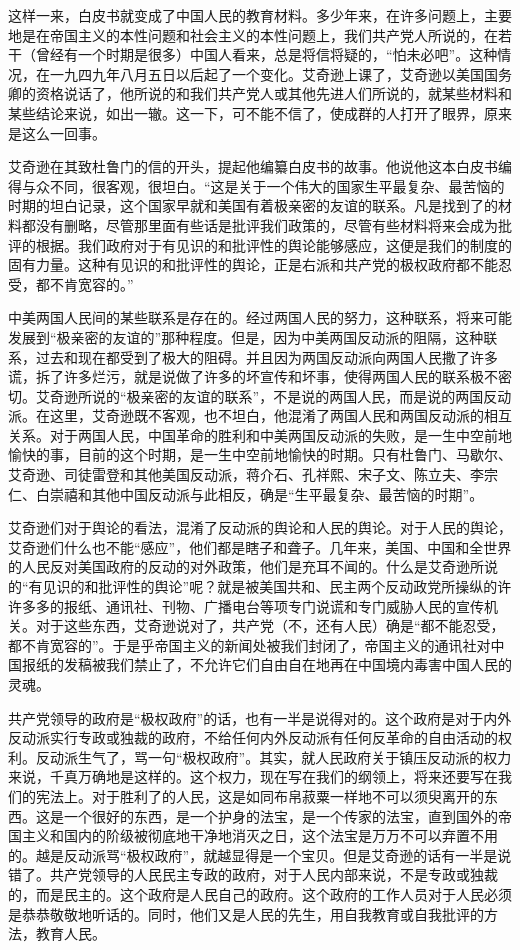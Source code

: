 \documentclass[UTF-8, a5paper, 12pt]{ctexart}
\begin{document}
这样一来，白皮书就变成了中国人民的教育材料。多少年来，在许多问题上，主要地是在帝国主义的本性问题和社会主义的本性问题上，我们共产党人所说的，在若干（曾经有一个时期是很多）中国人看来，总是将信将疑的，“怕未必吧”。这种情况，在一九四九年八月五日以后起了一个变化。艾奇逊上课了，艾奇逊以美国国务卿的资格说话了，他所说的和我们共产党人或其他先进人们所说的，就某些材料和某些结论来说，如出一辙。这一下，可不能不信了，使成群的人打开了眼界，原来是这么一回事。

艾奇逊在其致杜鲁门的信的开头，提起他编纂白皮书的故事。他说他这本白皮书编得与众不同，很客观，很坦白。“这是关于一个伟大的国家生平最复杂、最苦恼的时期的坦白记录，这个国家早就和美国有着极亲密的友谊的联系。凡是找到了的材料都没有删略，尽管那里面有些话是批评我们政策的，尽管有些材料将来会成为批评的根据。我们政府对于有见识的和批评性的舆论能够感应，这便是我们的制度的固有力量。这种有见识的和批评性的舆论，正是右派和共产党的极权政府都不能忍受，都不肯宽容的。”

中美两国人民间的某些联系是存在的。经过两国人民的努力，这种联系，将来可能发展到“极亲密的友谊的”那种程度。但是，因为中美两国反动派的阻隔，这种联系，过去和现在都受到了极大的阻碍。并且因为两国反动派向两国人民撒了许多谎，拆了许多烂污，就是说做了许多的坏宣传和坏事，使得两国人民的联系极不密切。艾奇逊所说的“极亲密的友谊的联系”，不是说的两国人民，而是说的两国反动派。在这里，艾奇逊既不客观，也不坦白，他混淆了两国人民和两国反动派的相互关系。对于两国人民，中国革命的胜利和中美两国反动派的失败，是一生中空前地愉快的事，目前的这个时期，是一生中空前地愉快的时期。只有杜鲁门、马歇尔、艾奇逊、司徒雷登和其他美国反动派，蒋介石、孔祥熙、宋子文、陈立夫、李宗仁、白崇禧和其他中国反动派与此相反，确是“生平最复杂、最苦恼的时期”。

艾奇逊们对于舆论的看法，混淆了反动派的舆论和人民的舆论。对于人民的舆论，艾奇逊们什么也不能“感应”，他们都是瞎子和聋子。几年来，美国、中国和全世界的人民反对美国政府的反动的对外政策，他们是充耳不闻的。什么是艾奇逊所说的“有见识的和批评性的舆论”呢？就是被美国共和、民主两个反动政党所操纵的许许多多的报纸、通讯社、刊物、广播电台等项专门说谎和专门威胁人民的宣传机关。对于这些东西，艾奇逊说对了，共产党（不，还有人民）确是“都不能忍受，都不肯宽容的”。于是乎帝国主义的新闻处被我们封闭了，帝国主义的通讯社对中国报纸的发稿被我们禁止了，不允许它们自由自在地再在中国境内毒害中国人民的灵魂。

共产党领导的政府是“极权政府”的话，也有一半是说得对的。这个政府是对于内外反动派实行专政或独裁的政府，不给任何内外反动派有任何反革命的自由活动的权利。反动派生气了，骂一句“极权政府”。其实，就人民政府关于镇压反动派的权力来说，千真万确地是这样的。这个权力，现在写在我们的纲领上，将来还要写在我们的宪法上。对于胜利了的人民，这是如同布帛菽粟一样地不可以须臾离开的东西。这是一个很好的东西，是一个护身的法宝，是一个传家的法宝，直到国外的帝国主义和国内的阶级被彻底地干净地消灭之日，这个法宝是万万不可以弃置不用的。越是反动派骂“极权政府”，就越显得是一个宝贝。但是艾奇逊的话有一半是说错了。共产党领导的人民民主专政的政府，对于人民内部来说，不是专政或独裁的，而是民主的。这个政府是人民自己的政府。这个政府的工作人员对于人民必须是恭恭敬敬地听话的。同时，他们又是人民的先生，用自我教育或自我批评的方法，教育人民。
\end{document}
